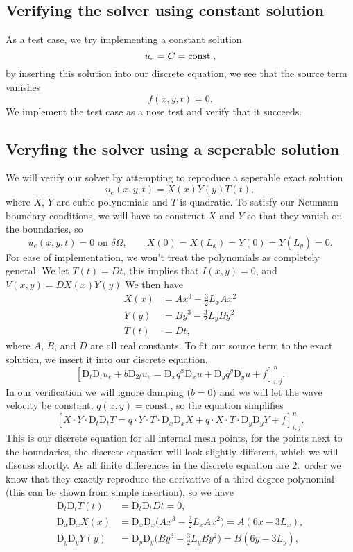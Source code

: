 \documentclass[a4paper, 11pt, notitlepage, english]{article}
\newcommand{\D}{\mbox{D}}
\begin{document}
\subsection*{Verifying the solver using constant solution}
As a test case, we try implementing a constant solution
$$u_e = C = {\rm const.},$$
by inserting this solution into our discrete equation, we see that the source term vanishes
$$f(x,y,t) = 0.$$
We implement the test case as a nose test and verify that it succeeds.

\subsection*{Veryfing the solver using a seperable solution}
We will verify our solver by attempting to reproduce a seperable exact solution
$$u_e(x,y,t) = X(x)Y(y)T(t),$$
where $X$, $Y$ are cubic polynomials and $T$ is quadratic. To satisfy our Neumann boundary conditions, we will have to construct $X$ and $Y$ so that they vanish on the boundaries, so
$$u_e(x,y,t) = 0 \mbox{ on } \delta\Omega, \qquad X(0)=X(L_x)=Y(0)=Y(L_y)=0.$$
For ease of implementation, we won't treat the polynomials as completely general. We let $T(t)=Dt$, this implies that $I(x,y)=0$, and $V(x,y)=DX(x)Y(y)$ We then have
\begin{align*}
X(x) &= A x^3 -\frac{3}{2}L_xAx^2 \\
Y(y) &= B y^3 -\frac{3}{2}L_yBy^2 \\
T(t) &= Dt,
\end{align*}
where $A$, $B$, and $D$ are all real constants. To fit our source term to the exact solution, we insert it into our discrete equation.
$$[\D_t\D_t u_e + b\D_{2t}u_e = \D_x \overline{q}^{x}\D_x u + \D_y \overline{q}^y \D_y u + f]^{n}_{i,j}.$$
In our verification we will ignore damping ($b=0$) and we will let the wave velocity be constant, $q(x,y)=\mbox{const.}$, so the equation simplifies 
$$[X\cdot Y\cdot \D_t\D_t T = q\cdot  Y\cdot T\cdot  \D_x \D_x X + q\cdot  X\cdot T\cdot  \D_y \D_y Y + f]^{n}_{i,j}.$$
This is our discrete equation for all internal mesh points, for the points next to the boundaries, the discrete equation will look slightly different, which we will discuss shortly. As all finite differences in the discrete equation are 2.\ order we know that they exactly reproduce the derivative of a third degree polynomial (this can be shown from simple insertion), so we have
\begin{align*}
\D_t \D_t T(t) &= \D_t \D_t Dt = 0, \\
\D_x \D_x X(x) &= \D_x \D_x \bigg(A x^3 -\frac{3}{2}L_xAx^2 \bigg) = A(6x - 3L_x), \\  
\D_y \D_y Y(y) &= \D_y \D_y \bigg(B y^3 -\frac{3}{2}L_yBy^2 \bigg) = B(6y - 3L_y), \\  
\end{align*}
\end{document}

